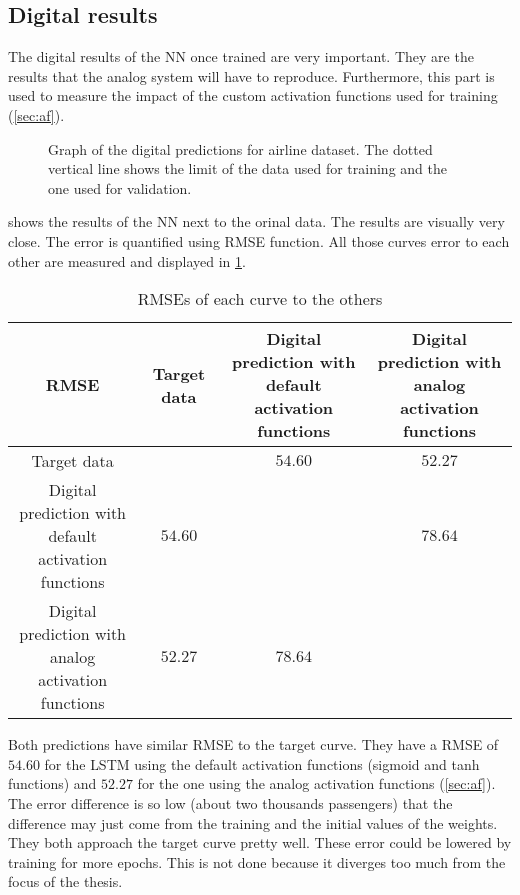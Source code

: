 \subsection{Digital results}
\label{subsec:digitalAirline}

The digital results of the \ac{NN} once trained are very important. They are the results that the analog system will have to reproduce. Furthermore, this part is used to measure the impact of the custom activation functions used for training (\cref{sec:af}).

\begin{figure}[H]
  \centering
  
  \caption{Graph of the digital predictions for airline dataset. The dotted vertical line shows the limit of the data used for training and the one used for validation.}
  \label{graph:airlineDigital}
\end{figure}

 shows the results of the \ac{NN} next to the orinal data. The results are visually very close. The error is quantified using \ac{RMSE} function. All those curves error to each other are measured and displayed in \cref{tab:airlineDigital}.

\begin{table}[H]
  \centering
  \begin{tabular}{|c|c|c|c|}
    \hline
    \cellcolor[HTML]{808080}\acs{RMSE} & Target data & \specialcell{Digital prediction with\\default activation functions} & \specialcell{Digital prediction with\\analog activation functions}\\
    \hline
    Target data &\cellcolor[HTML]{202020} & $54.60$ & $52.27$\\
    \hline
    \specialcell{Digital prediction with\\default activation functions}  & $54.60$ & \cellcolor[HTML]{202020} & $78.64$\\
    \hline
    \specialcell{Digital prediction with\\analog activation functions} & $52.27$ & $78.64$ & \cellcolor[HTML]{202020}\\
    \hline
  \end{tabular}
  \caption{\acp{RMSE} of each curve to the others}
  \label{tab:airlineDigital}
\end{table}

Both predictions have similar \ac{RMSE} to the target curve. They have a \ac{RMSE} of $54.60$ for the \ac{LSTM} using the default activation functions (sigmoid and \ac{tanh} functions) and $52.27$ for the one using the analog activation functions (\cref{sec:af}). The error difference is so low (about two thousands passengers) that the difference may just come from the training and the initial values of the weights. They both approach the target curve pretty well. These error could be lowered by training for more epochs. This is not done because it diverges too much from the focus of the thesis.

